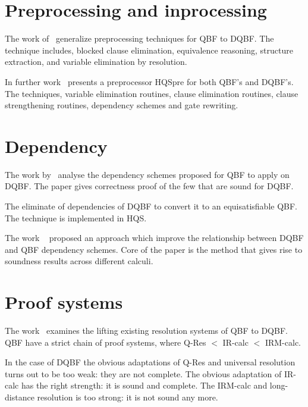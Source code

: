 \documentclass[runningheads]{llncs}
\begin{document}
\section{Preprocessing and inprocessing}
The work of~\cite{wimmer2015preprocessing} generalize preprocessing techniques for QBF to DQBF. 
%
The technique includes, blocked clause elimination, equivalence reasoning, structure extraction, and variable elimination by resolution.

In further work~\cite{wimmer2017hqspre} presents a preprocessor HQSpre for both QBF's and DQBF's.
%
The techniques, variable elimination routines, clause elimination routines, clause strengthening routines, dependency schemes and gate rewriting.

\section{Dependency}
The work by~\cite{wimmer2016dependency} analyse the dependency
schemes proposed for QBF to apply on DQBF. 
%
The paper gives correctness proof of the few that are sound for DQBF. 
%

The \cite{wimmer2017dqbf} eliminate of dependencies of DQBF to convert it to an equisatisfiable QBF.
%
The technique is implemented in HQS.



The work ~\cite{beyersdorff2018reinterpreting} proposed an approach which improve the relationship between DQBF and QBF
dependency schemes.
%
Core of the paper is the method that gives rise to soundness results across different calculi.

\section{Proof systems}
The work~\cite{beyersdorff2016lifting} examines the lifting existing resolution systems of QBF to DQBF.
%
QBF have a strict chain of proof systems, where Q-Res $<$ IR-calc $<$ IRM-calc.
%

In the case of DQBF the obvious adaptations of Q-Res and universal resolution turns out to be too weak: they are not complete. 
%
The obvious adaptation of IR-calc has
the right strength: it is sound and complete. 
%
The IRM-calc and long-distance resolution is too strong: it is not sound any more.
\end{document}
